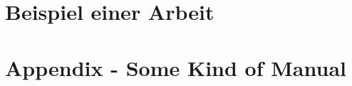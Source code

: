 \frenchspacing
\raggedbottom
{} %
\pagestyle{plain}


\cleardoublepage
\cleardoublepage
\pagestyle{scrheadings}
\cleardoublepage
\cleardoublepage
\cleardoublepage
\cleardoublepage
\cleardoublepage
\cleardoublepage\part{Beispiel einer Arbeit}



\appendix
\cleardoublepage\part{Appendix - Some Kind of Manual}

\cleardoublepage


